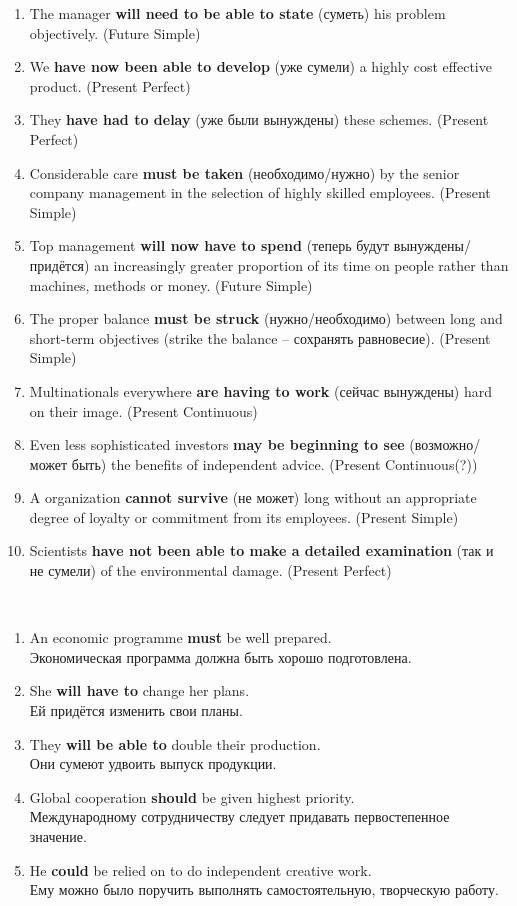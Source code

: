 \documentclass[main.tex]{subfiles}
\begin{document}
\begin{enumerate}[nosep,leftmargin=*]
	\itemsep\eitsp
	\item The manager \textbf{will need to be able to state} (суметь) his problem objectively. (Future Simple)
	\item We \textbf{have now been able to develop} (уже сумели) a highly cost effective product. (Present Perfect)
	\item They \textbf{have had to delay} (уже были вынуждены) these schemes. (Present Perfect)
	\item Considerable care \textbf{must be taken} (необходимо/нужно) by the senior company management in the selection of highly skilled employees. (Present Simple)
	\item Top management \textbf{will now have to spend} (теперь будут вынуждены/придётся) an increasingly greater proportion of its time on people rather than machines, methods or money. (Future Simple)
	\item The proper balance \textbf{must be struck} (нужно/необходимо) between long and short-term objectives (strike the balance -- сохранять равновесие). (Present Simple)
	\item Multinationals everywhere \textbf{are having to work} (сейчас вынуждены) hard on their image. (Present Continuous)
	\item Even less sophisticated investors \textbf{may be beginning to see} (возможно/может быть) the benefits of independent advice. (Present Continuous(?))
	\item A organization \textbf{cannot survive} (не может) long without an appropriate degree of loyalty or commitment from its employees. (Present Simple)
	\item Scientists \textbf{have not been able to make a detailed examination} (так и не сумели) of the environmental damage. (Present Perfect)
\end{enumerate}
\


\begin{enumerate}[nosep,leftmargin=*]
	\itemsep\eitsp
	\item An economic programme \textbf{must} be well prepared.\\
	Экономическая программа должна быть хорошо подготовлена.
	\item She \textbf{will have to} change her plans.\\
	Ей придётся изменить свои планы.
	\item They \textbf{will be able to} double their production.\\
	Они сумеют удвоить выпуск продукции.
	\item Global cooperation \textbf{should} be given highest priority.\\
	Международному сотрудничеству следует придавать первостепенное значение.
	\item He \textbf{could} be relied on to do independent creative work.\\
	Ему можно было поручить выполнять самостоятельную, творческую работу.
\end{enumerate}
\end{document}
